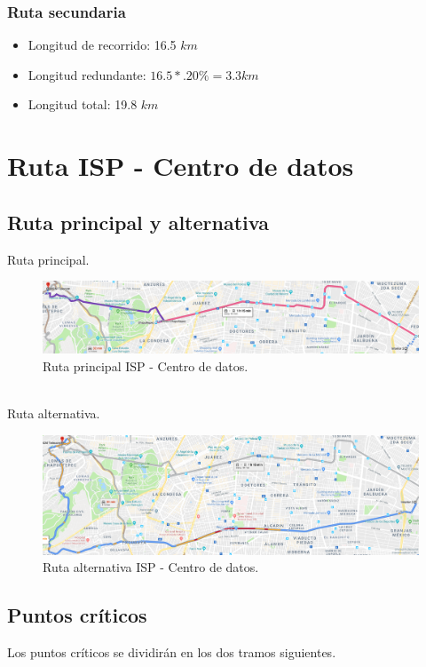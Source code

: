\documentclass[12pt,letterpaper]{article}
\begin{document}
\subsubsection{Ruta secundaria}
\begin{itemize}
    \item Longitud de recorrido: 16.5 $km$
    \item Longitud redundante: $16.5*.20\%=3.3km$
    \item Longitud total: 19.8 $km$ 
\end{itemize}

\newpage
\section{Ruta ISP - Centro de datos}
\subsection{Ruta principal y alternativa}
Ruta principal.
\begin{figure}[ht]
    \centering
    \includegraphics[width=1\textwidth]{f22.png}
    \caption{Ruta principal ISP - Centro de datos.}
\end{figure}
\\
Ruta alternativa.
\begin{figure}[ht]
    \centering
    \includegraphics[width=1\textwidth]{f23.png}
    \caption{Ruta alternativa ISP - Centro de datos.}
\end{figure}

\newpage
\subsection{Puntos críticos}
Los puntos críticos se dividirán en los dos tramos siguientes.
\end{document}
